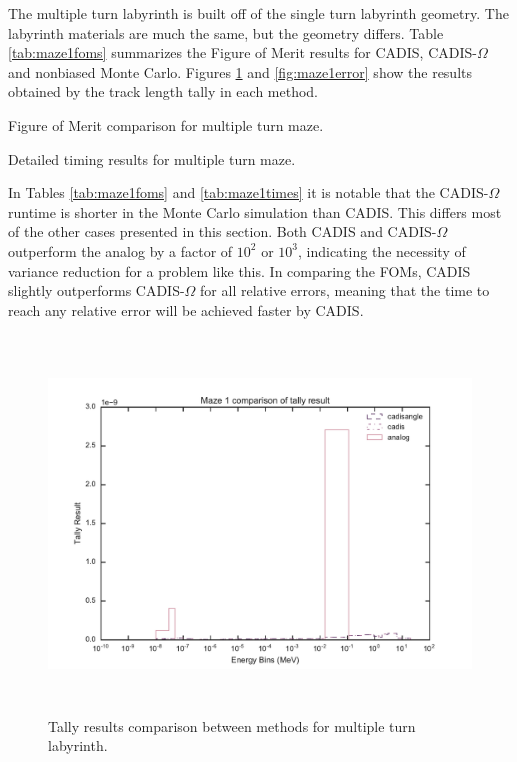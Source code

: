The multiple turn labyrinth is built off of the single turn labyrinth geometry.
The labyrinth materials are much the same, but the geometry differs. Table
\ref{tab:maze1foms} summarizes the Figure of Merit results for CADIS,
CADIS-$\Omega$ and nonbiased Monte Carlo. Figures \ref{fig:maze1result} and
\ref{fig:maze1error} show the results obtained by the track length tally in each
method.

\begin{table}[h!]
  \centering
  
  \caption[Figure of Merit comparison for multiple turn maze.]{Figure of Merit
    comparison for multiple turn maze.}
  \label{tab:maze1foms}
\end{table}

\begin{table}[h!]
  \centering
  
  \caption[Detailed timing results for multiple turn maze.]
  {Detailed timing results for multiple turn maze.}
  \label{tab:maze1times}
\end{table}

In Tables \ref{tab:maze1foms} and \ref{tab:maze1times}
it is notable that the CADIS-$\Omega$ runtime is
shorter in the Monte Carlo simulation than CADIS. This differs most of the other
cases presented in this section. Both CADIS and CADIS-$\Omega$ outperform the
analog by a factor of $10^2$ or $10^3$, indicating the necessity of variance
reduction for a problem like this. In comparing the FOMs, CADIS slightly outperforms
CADIS-$\Omega$ for all relative errors, meaning that the time
to reach any relative error will be achieved faster by CADIS.

\begin{figure}[h!]
  \centering
  \includegraphics[height=10cm]{./chapters/characterization_probs/figures/char/maze1/maze_1_tally_result_compare.pdf}
  \caption[Tally results comparison between methods for multiple turn labyrinth.]
  {Tally results comparison between methods for multiple turn labyrinth. }
  \label{fig:maze1result}
\end{figure}

